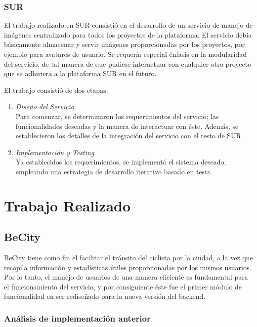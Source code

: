 \documentclass[11pt,letterpaper]{article}
\begin{document}
\subsubsection{SUR}

El trabajo realizado en SUR consistió en el desarrollo de un servicio de manejo de imágenes centralizado para todos los proyectos de la plataforma. El servicio debía básicamente almacenar y servir imágenes proporcionadas por los proyectos, por ejemplo para avatares de usuario. Se requería especial énfasis en la modularidad del servicio, de tal manera de que pudiese interactuar con cualquier otro proyecto que se adhiriera a la plataforma SUR en el futuro.

El trabajo consistió de dos etapas:
\begin{enumerate}
    \item \emph{Diseño del Servicio}\\ Para comenzar, se determinaron los requerimientos del servicio; las funcionalidades deseadas y la manera de interactuar con éste. Además, se establecieron los detalles de la integración del servicio con el resto de SUR.
    \item \emph{Implementación y Testing}\\ Ya establecidos los requerimientos, se implementó el sistema deseado, empleando una estrategia de desarrollo iterativo basado en tests.
\end{enumerate}

\newpage
\section{Trabajo Realizado}

\subsection{BeCity}

BeCity tiene como fin el facilitar el tránsito del ciclista por la ciudad, a la vez que recopila información y estadísticas útiles proporcionadas por los mismos usuarios. Por lo tanto, el manejo de usuarios de una manera eficiente es fundamental para el funcionamiento del servicio, y por consiguiente éste fue el primer módulo de funcionalidad en ser rediseñado para la nueva versión del backend.

\subsubsection{Análisis de implementación anterior}
\end{document}
